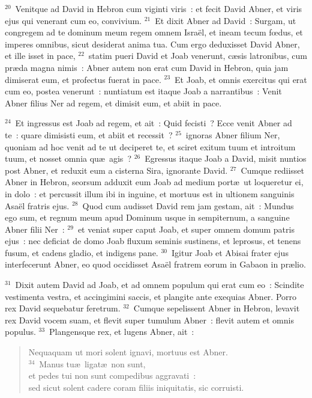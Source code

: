 ${}^{20}$~Venitque ad David in Hebron cum viginti viris~: et fecit David Abner, et viris ejus qui venerant cum eo, convivium.
${}^{21}$~Et dixit Abner ad David~: Surgam, ut congregem ad te dominum meum regem omnem Isra\"el, et ineam tecum fœdus, et imperes omnibus, sicut desiderat anima tua. Cum ergo deduxisset David Abner, et ille isset in pace,
${}^{22}$~statim pueri David et Joab venerunt, c\ae sis latronibus, cum pr\ae da magna nimis~: Abner autem non erat cum David in Hebron, quia jam dimiserat eum, et profectus fuerat in pace.
${}^{23}$~Et Joab, et omnis exercitus qui erat cum eo, postea venerunt~: nuntiatum est itaque Joab a narrantibus~: Venit Abner filius Ner ad regem, et dimisit eum, et abiit in pace.


${}^{24}$~Et ingressus est Joab ad regem, et ait~: Quid fecisti~? Ecce venit Abner ad te~: quare dimisisti eum, et abiit et recessit~?
${}^{25}$~ignoras Abner filium Ner, quoniam ad hoc venit ad te ut deciperet te, et sciret exitum tuum et introitum tuum, et nosset omnia qu\ae\ agis~?
${}^{26}$~Egressus itaque Joab a David, misit nuntios post Abner, et reduxit eum a cisterna Sira, ignorante David.
${}^{27}$~Cumque rediisset Abner in Hebron, seorsum adduxit eum Joab ad medium port\ae\ ut loqueretur ei, in dolo~: et percussit illum ibi in inguine, et mortuus est in ultionem sanguinis Asa\"el fratris ejus.
${}^{28}$~Quod cum audisset David rem jam gestam, ait~: Mundus ego sum, et regnum meum apud Dominum usque in sempiternum, a sanguine Abner filii Ner~:
${}^{29}$~et veniat super caput Joab, et super omnem domum patris ejus~: nec deficiat de domo Joab fluxum seminis sustinens, et leprosus, et tenens fusum, et cadens gladio, et indigens pane.
${}^{30}$~Igitur Joab et Abisai frater ejus interfecerunt Abner, eo quod occidisset Asa\"el fratrem eorum in Gabaon in pr\ae lio.


${}^{31}$~Dixit autem David ad Joab, et ad omnem populum qui erat cum eo~: Scindite vestimenta vestra, et accingimini saccis, et plangite ante exequias Abner. Porro rex David sequebatur feretrum.
${}^{32}$~Cumque sepelissent Abner in Hebron, levavit rex David vocem suam, et flevit super tumulum Abner~: flevit autem et omnis populus.
${}^{33}$~Plangensque rex, et lugens Abner, ait~: \begin{flushleft}\begin{verse}Nequaquam ut mori solent ignavi, mortuus est Abner.\\
${}^{34}$~Manus tu\ae\ ligat\ae\ non sunt,\\ et pedes tui non sunt compedibus aggravati~:\\ sed sicut solent cadere coram filiis iniquitatis, sic corruisti.\end{verse}\end{flushleft}

